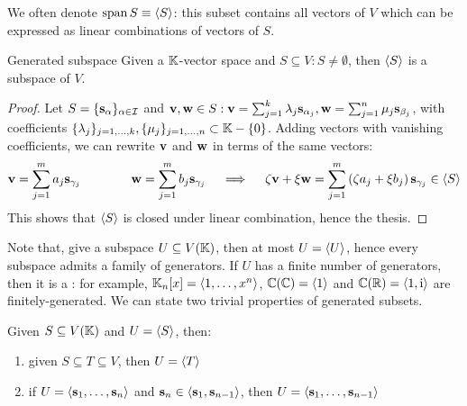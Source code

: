 We often denote $ \operatorname{span}{S} \equiv \braket{S} $: this subset contains all vectors of $ V $ which can be expressed as linear combinations of vectors of $ S $.

\begin{proposition}{Generated subspace}{}
  Given a $ \mathbb{K} $-vector space and $ S \subseteq V : S \neq \emptyset $, then $ \braket{S} $ is a subspace of $ V $.
\end{proposition}

\begin{proofbox}
  \begin{proof}
    Let $ S = \{\mathbf{s}_\alpha\}_{\alpha \in \mathcal{I}} $ and $ \mathbf{v} , \mathbf{w} \in S : \mathbf{v} = \sum_{j = 1}^k \lambda_j \mathbf{s}_{\alpha_j} , \mathbf{w} = \sum_{j = 1}^n \mu_j \mathbf{s}_{\beta_j} $, with coefficients $ \{\lambda_j\}_{j = 1, \dots, k} , \{\mu_j\}_{j = 1, \dots, n} \subset \mathbb{K} - \{0\} $. Adding vectors with vanishing coefficients, we can rewrite $ \mathbf{v} $ and $ \mathbf{w} $ in terms of the same vectors:
    \begin{equation*}
      \mathbf{v} = \sum_{j = 1}^m a_j \mathbf{s}_{\gamma_j}
      \qquad \qquad
      \mathbf{w} = \sum_{j = 1}^m b_j \mathbf{s}_{\gamma_j}
      \quad \implies \quad
      \zeta \mathbf{v} + \xi \mathbf{w} = \sum_{j = 1}^m \left( \zeta a_j + \xi b_j \right) \mathbf{s}_{\gamma_j} \in \braket{S}
    \end{equation*}
    This shows that $ \braket{S} $ is closed under linear combination, hence the thesis.
  \end{proof}
\end{proofbox}

Note that, give a subspace $ U \subseteq V(\mathbb{K}) $, then at most $ U = \braket{U} $, hence every subspace admits a family of generators. If $ U $ has a finite number of generators, then it is a : for example, $ \mathbb{K}_n[x] = \braket{1, \dots, x^n} $, $ \mathbb{C}(\mathbb{C}) = \braket{1} $ and $ \mathbb{C}(\mathbb{R}) = \braket{1, \mathrm{i}} $ are finitely-generated.
We can state two trivial properties of generated subsets.

\begin{lemma}{}{}
  Given $ S \subseteq V(\mathbb{K}) $ and $ U = \braket{S} $, then:
  \begin{enumerate}[label = {\alph*.}]
    \item given $ S \subseteq T \subseteq V $, then $ U = \braket{T} $
    \item if $ U = \braket{\mathbf{s}_1 , \dots , \mathbf{s}_n} $ and $ \mathbf{s}_n \in \braket{\mathbf{s}_1 , \mathbf{s}_{n-1}} $, then $ U = \braket{\mathbf{s}_1 , \dots , \mathbf{s}_{n-1}} $
  \end{enumerate}
\end{lemma}

